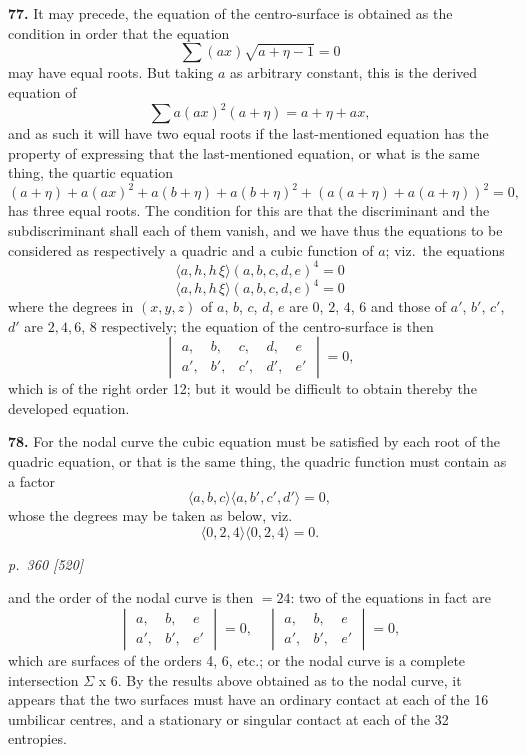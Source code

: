 \documentclass[11pt,a4paper]{article}
\theoremstyle{plain}
\theoremstyle{definition}
\begin{document}
\textbf{77.} It may precede, the equation of the centro-surface is obtained as the condition in order that the equation
\[
\sum(a x)\sqrt{a + \eta - 1} = 0
\]
may have equal roots. But taking $a$ as arbitrary constant, this is the derived equation of
\[
\sum a (a x)^2 (a + \eta) = a + \eta + a x,
\]
and as such it will have two equal roots if the last-mentioned equation has the property of expressing that the last-mentioned equation, or what is the same thing, the quartic equation
\[
(a + \eta) + a (a x)^2 + a (b + \eta) + a (b + \eta)^2 + (a (a + \eta) + a (a + \eta))^2 = 0,
\]
has three equal roots. The condition for this are that the discriminant and the subdiscriminant shall each of them vanish, and we have thus the equations to be considered as respectively a quadric and a cubic function of $a$; viz.\ the equations
\[
\langle a, h, h\,\xi \rangle (a, b, c, d, e)^4 = 0
\]
\[
\langle a, h, h\,\xi \rangle (a, b, c, d, e)^4 = 0
\]
where the degrees in $(x, y, z)$ of $a$, $b$, $c$, $d$, $e$ are $0$, $2$, $4$, $6$ and those of $a'$, $b'$, $c'$, $d'$ are $2, 4, 6$, $8$ respectively; the equation of the centro-surface is then
\[
\begin{vmatrix} a, & b, & c, & d, & e \\
a', & b', & c', & d', & e' \end{vmatrix} = 0,
\]
which is of the right order 12; but it would be difficult to obtain thereby the developed equation.

\textbf{78.} For the nodal curve the cubic equation must be satisfied by each root of the quadric equation, or that is the same thing, the quadric function must contain as a factor
\[
\langle a, b, c \rangle \langle a, b', c', d' \rangle = 0,
\]
whose the degrees may be taken as below, viz.
\[
\langle 0, 2, 4 \rangle \langle 0, 2, 4 \rangle = 0.
\]

\clearpage

\bigskip
\textit{p.~360 [520]}
\smallskip

and the order of the nodal curve is then $= 24$: two of the equations in fact are
\[
\begin{vmatrix} a, & b, & e \\
a', & b', & e' \end{vmatrix} = 0,\quad \begin{vmatrix} a, & b, & e \\
a', & b', & e' \end{vmatrix} = 0,
\]
which are surfaces of the orders 4, 6, etc.; or the nodal curve is a complete intersection $\Sigma$ x 6. By the results above obtained as to the nodal curve, it appears that the two surfaces must have an ordinary contact at each of the 16 umbilicar centres, and a stationary or singular contact at each of the 32 entropies.
\end{document}
